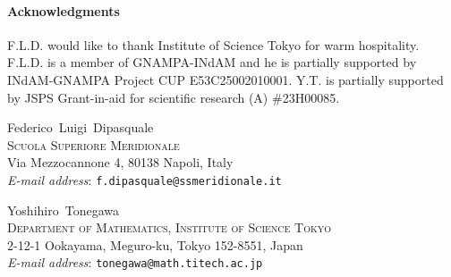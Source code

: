 \documentclass[a4paper, 11pt, twoside, leqno]{article}
\makeatletter
\theoremstyle{definition}              %
\theoremstyle{remark}                  %
\newcommand{\Addresses}{{%
  \bigskip
  \footnotesize

  Federico~Luigi~Dipasquale \\
  \textsc{Scuola Superiore Meridionale}\\
  Via Mezzocannone 4, 80138 Napoli, Italy\\
  \textit{E-mail address}: \texttt{f.dipasquale@ssmeridionale.it}

    \medskip

   Yoshihiro~Tonegawa \\
    \textsc{Department of Mathematics, Institute of Science Tokyo}\\
    2-12-1 Ookayama, Meguro-ku, Tokyo 152-8551, Japan\\ %
  \textit{E-mail address}: \texttt{tonegawa@math.titech.ac.jp}
}}
\makeatother
\begin{document}
\paragraph{Acknowledgments}
F.L.D. would like to thank Institute of Science Tokyo for warm hospitality.
F.L.D. is a member of GNAMPA-INdAM and he is partially supported by 
INdAM-GNAMPA Project CUP E53C25002010001. Y.T. is partially supported by 
JSPS Grant-in-aid for scientific research (A) {\#}23H00085. 





\begin{flushright}
\Addresses
\end{flushright}
\end{document}
